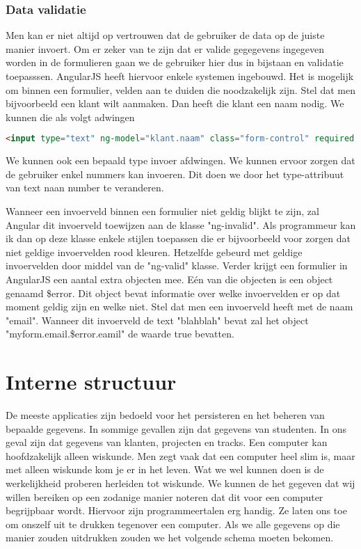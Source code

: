 \documentclass[a4paper,11pt]{article}
\begin{document}
\subsubsection{Data validatie}
Men kan er niet altijd op vertrouwen dat de gebruiker de data op de juiste manier invoert. Om er zeker van te zijn dat er valide gegegevens ingegeven worden in de formulieren gaan we de gebruiker hier dus in bijstaan en validatie toepasssen. AngularJS heeft hiervoor enkele systemen ingebouwd. Het is mogelijk om binnen een formulier, velden aan te duiden die noodzakelijk zijn. Stel dat men bijvoorbeeld een klant wilt aanmaken. Dan heeft die klant een naam nodig. We kunnen die als volgt adwingen
\begin{lstlisting}[language=html]
<input type="text" ng-model="klant.naam" class="form-control" required />
\end{lstlisting}

We kunnen ook een bepaald type invoer afdwingen. We kunnen ervoor zorgen dat de gebruiker enkel nummers kan invoeren. Dit doen we door het type-attribuut van text naan number te veranderen.

Wanneer een invoerveld binnen een formulier niet geldig blijkt te zijn, zal Angular dit invoerveld toewijzen aan de klasse "ng-invalid". Als programmeur kan ik dan op deze klasse enkele stijlen toepassen die er bijvoorbeeld voor zorgen dat niet geldige invoervelden rood kleuren. Hetzelfde gebeurd met geldige invoervelden door middel van de "ng-valid" klasse. Verder krijgt een formulier in AngularJS een aantal extra objecten mee. Eén van die objecten is een object genaamd \$error. Dit object bevat informatie over welke invoervelden er op dat moment geldig zijn en welke niet. Stel dat men een invoerveld heeft met de naam "email". Wanneer dit invoerveld de text "blahblah" bevat zal het object "myform.email.\$error.eamil" de waarde true bevatten.


\section{Interne structuur} %
De meeste applicaties zijn bedoeld voor het persisteren en het beheren van bepaalde gegevens. In sommige gevallen zijn dat gegevens van studenten. In ons geval zijn dat gegevens van klanten, projecten en tracks. Een computer kan hoofdzakelijk alleen wiskunde. Men zegt vaak dat een computer heel slim is, maar met alleen wiskunde kom je er in het leven. Wat we wel kunnen doen is de werkelijkheid proberen herleiden tot wiskunde. We kunnen de het gegeven dat wij willen bereiken op een zodanige manier noteren dat dit voor een computer begrijpbaar wordt. Hiervoor zijn programmeertalen erg handig. Ze laten ons toe om onszelf uit te drukken tegenover een computer. Als we alle gegevens op die manier zouden uitdrukken zouden we het volgende schema moeten bekomen.
\end{document}
